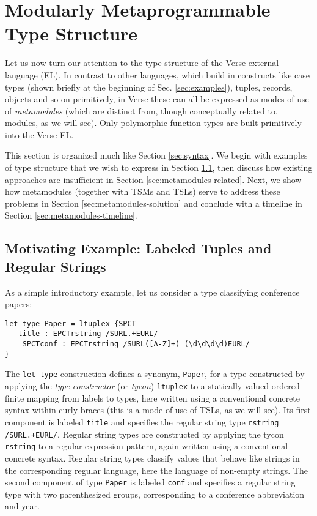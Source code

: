 
\section{Modularly Metaprogrammable Type Structure}\label{sec:metamodules}
Let us now turn our attention to the type structure of the Verse external language (EL). In contrast to other languages, which build in constructs like case types (shown briefly at the beginning of Sec. \ref{sec:examples}), tuples, records, objects and so on primitively, in Verse these can all be expressed as modes of use of \emph{metamodules} (which are distinct from, though conceptually related to, {modules}, as we will see). Only polymorphic function types are built primitively into the Verse EL.

This section is organized much like Section \ref{sec:syntax}. We begin with examples of type structure that we wish to express in Section \ref{sec:metamodules-example}, then discuss how existing approaches are insufficient in Section \ref{sec:metamodules-related}. Next, we show how metamodules (together with TSMs and TSLs) serve to address these problems in Section \ref{sec:metamodules-solution} and conclude with a timeline in Section \ref{sec:metamodules-timeline}. 

\subsection{Motivating Example: Labeled Tuples and Regular Strings}\label{sec:metamodules-example}
As a simple introductory example, let us consider a type classifying conference papers:
\begin{lstlisting}[numbers=none]
let type Paper = ltuplex {SPCT
   title : EPCTrstring /SURL.+EURL/
    SPCTconf : EPCTrstring /SURL([A-Z]+) (\d\d\d\d)EURL/
}
\end{lstlisting}
The \lstinline{let type} construction defines a synonym, \lstinline{Paper}, for a type constructed by applying the \emph{type constructor} (or \emph{tycon}) \lstinline{ltuplex} to a statically valued ordered finite mapping from labels to types, here written using a conventional concrete syntax within curly braces (this is a mode of use of TSLs, as we will see). Its first component is labeled \lstinline{title} and specifies the regular string type \lstinline{rstring /SURL.+EURL/}. Regular string types are constructed by applying the tycon \lstinline{rstring} to a regular expression pattern, again written using a conventional concrete syntax. Regular string types classify values that behave like strings in the corresponding regular language, here the language of non-empty strings. The second component of type \lstinline{Paper} is labeled \lstinline{conf} and specifies a regular string type with two parenthesized groups, corresponding to a conference abbreviation and year.

